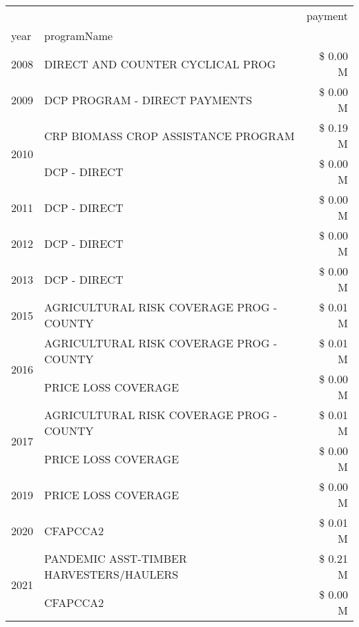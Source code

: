 \begin{tabular}{llr}
\toprule
 &  & payment \\
year & programName &  \\
\midrule
2008 & DIRECT AND COUNTER CYCLICAL PROG & \$ 0.00 M \\
\cline{1-3}
2009 & DCP PROGRAM - DIRECT PAYMENTS & \$ 0.00 M \\
\cline{1-3}
\multirow[t]{2}{*}{2010} & CRP BIOMASS CROP ASSISTANCE PROGRAM & \$ 0.19 M \\
 & DCP - DIRECT & \$ 0.00 M \\
\cline{1-3}
2011 & DCP - DIRECT & \$ 0.00 M \\
\cline{1-3}
2012 & DCP - DIRECT & \$ 0.00 M \\
\cline{1-3}
2013 & DCP - DIRECT & \$ 0.00 M \\
\cline{1-3}
2015 & AGRICULTURAL RISK COVERAGE PROG - COUNTY & \$ 0.01 M \\
\cline{1-3}
\multirow[t]{2}{*}{2016} & AGRICULTURAL RISK COVERAGE PROG - COUNTY & \$ 0.01 M \\
 & PRICE LOSS COVERAGE & \$ 0.00 M \\
\cline{1-3}
\multirow[t]{2}{*}{2017} & AGRICULTURAL RISK COVERAGE PROG - COUNTY & \$ 0.01 M \\
 & PRICE LOSS COVERAGE & \$ 0.00 M \\
\cline{1-3}
2019 & PRICE LOSS COVERAGE & \$ 0.00 M \\
\cline{1-3}
2020 & CFAPCCA2 & \$ 0.01 M \\
\cline{1-3}
\multirow[t]{2}{*}{2021} & PANDEMIC ASST-TIMBER HARVESTERS/HAULERS & \$ 0.21 M \\
 & CFAPCCA2 & \$ 0.00 M \\
\cline{1-3}
\bottomrule
\end{tabular}
